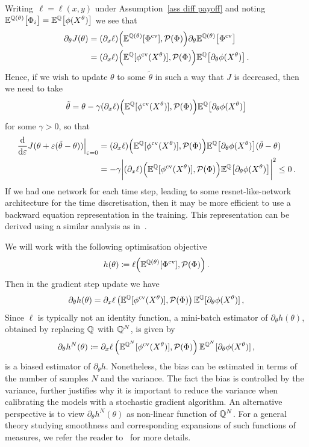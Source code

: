 Writing~$\ell = \ell(x,y)$ under Assumption~\ref{ass diff payoff} and noting~${\mathbb{E}^{\mathbb{Q}(\theta)} \big[ \Phi_i \big] = \mathbb{E}^{\mathbb{Q}} \big[ \phi(X^\theta) \big]}$ we see that
\[
\begin{split}
\partial_\theta J(\theta) & =  (\partial_x \ell)\Big(\mathbb{E}^{\mathbb{Q}(\theta)}[\Phi^{\textup{cv}}], \mathcal{P}(\Phi) \Big) \partial_\theta \mathbb{E}^{\mathbb{Q}(\theta)} \big[ \Phi^{\textup{cv}} \big] \\
& =  (\partial_x \ell)\Big(\mathbb{E}^{\mathbb{Q}}[\phi^{\textup{cv}}(X^\theta)], \mathcal{P}(\Phi) \Big) \mathbb{E}^{\mathbb{Q}} \big[ \partial_\theta \phi(X^\theta) \big]\,. 	
\end{split}
\]
Hence, if we wish to update $\theta$ to some $\tilde \theta$ in such a way that $J$ is decreased, then we need to take 
\[
\tilde \theta = \theta - \gamma  (\partial_x \ell)\Big(\mathbb{E}^{\mathbb{Q}}[\phi^{\textup{cv}}(X^\theta)], \mathcal{P}(\Phi) \Big) \mathbb{E}^{\mathbb{Q}} \big[ \partial_\theta \phi(X^\theta) \big] 
\]
for some $\gamma > 0$, so that
\[
\begin{split}
\frac{\mathrm{d}}{\mathrm{d}\varepsilon} J(\theta + \varepsilon (\tilde \theta - \theta)) \Big \rvert_{\varepsilon=0} 
 & = (\partial_x \ell)\Big(\mathbb{E}^{\mathbb{Q}}[\phi^{\textup{cv}}(X^\theta)], \mathcal{P}(\Phi) \Big) \mathbb{E}^{\mathbb{Q}} \big[ \partial_\theta \phi(X^\theta) \big](\tilde \theta - \theta)\\
& = - \gamma \bigg|  (\partial_x \ell)\Big(\mathbb{E}^{\mathbb{Q}}[\phi^{\textup{cv}}(X^\theta)], \mathcal{P}(\Phi) \Big) \mathbb{E}^{\mathbb{Q}} \big[ \partial_\theta \phi(X^\theta) \big]\bigg|^2 \leq 0\,.
\end{split}
\]
If we had one network for each time step, leading to some resnet-like-network architecture for the time discretisation, then it may be more efficient to use a backward equation representation in the training. 
This representation can be derived using a similar analysis as in~\cite{Jabir2019Mean-FieldControl, Siska2020GradientProblems}. 

We will work with the following optimisation objective
\[
h(\theta) \coloneqq  \ell\Big(\mathbb{E}^{\mathbb{Q}(\theta)}[\Phi^{\textup{cv}}], \mathcal{P}(\Phi)\Big)\,.	
\]
Then in the gradient step update we have 
\[
\partial_{\theta}h(\theta) =  \partial_x \ell\left(\mathbb{E}^{\mathbb{Q}}[\phi^{\textup{cv}}(X^{\theta})],\mathcal{P}(\Phi) \right) \mathbb{E}^{\mathbb{Q}}[\partial_\theta \phi(X^{\theta})]\,,
\]
Since $\ell$ is typically not an identity function, a mini-batch estimator of 
$\partial_{\theta}h(\theta)$, obtained by replacing $\mathbb{Q}$ with $\mathbb{Q}^N$, is given by
\[
\partial_{\theta}h^{N}(\theta) \coloneqq   \partial_x \ell\left(\mathbb{E}^{\mathbb{Q}^N}[\phi^{\textup{cv}}(X^{\theta})],\mathcal{P}(\Phi) \right) \mathbb{E}^{\mathbb{Q}^N}[\partial_\theta \phi(X^{\theta})]\,,
\]
is a biased estimator of $\partial_{\theta}h$. Nonetheless, the bias can be estimated in terms of the number of samples $N$ and the variance. The fact the bias is controlled by the variance, further justifies why it is important to reduce the variance when calibrating the models with a stochastic gradient algorithm. 
An alternative perspective is to view $\partial_{\theta}h^{N}(\theta) $ as non-linear function of $\mathbb{Q}^N$. For a general theory studying smoothness and corresponding expansions of such functions of measures, we refer the reader to~\cite{Chassagneux2019WeakMeasures} for more details. 

